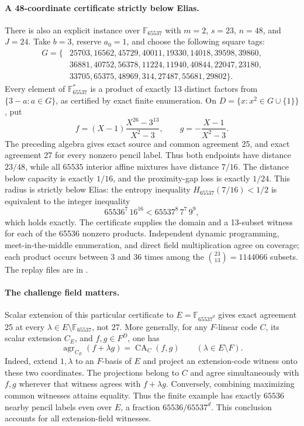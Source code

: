 \paragraph{A 48-coordinate certificate strictly below Elias.}
There is also an explicit instance over $\mathbb F_{65537}$ with
$m=2$, $s=23$, $n=48$, and $J=24$. Take $b=3$, reserve $a_0=1$,
and choose the following square tags:
\[
\begin{split}
G=\{&25703,16562,45729,40011,19330,14018,39598,39860,\allowbreak\\
    &36881,40752,56378,11224,11940,40844,22047,23180,\allowbreak\\
    &33705,65375,48969,314,27487,55681,29802\}.
\end{split}
\]
Every element of $\mathbb F_{65537}^*$ is a product of exactly
13 distinct factors from $\{3-a:a\in G\}$, as certified by exact
finite enumeration. On $D=\{x:x^2\in G\cup\{1\}\}$, put
\[
 f=(X-1)\frac{X^{26}-3^{13}}{X^2-3},\qquad
 g=-\frac{X-1}{X^2-3}.
\]
The preceding algebra gives exact source and common agreement 25,
and exact agreement 27 for every nonzero pencil label. Thus both
endpoints have distance $23/48$, while all $65535$ interior affine
mixtures have distance $7/16$. The distance below capacity is exactly
$1/16$, and the proximity-gap loss is exactly $1/24$.
This radius is strictly below Elias: the entropy inequality
$H_{65537}(7/16)<1/2$ is equivalent to the integer inequality
\[
 65536^7\,16^{16}<65537^8\,7^7\,9^9,
\]
which holds exactly. The certificate supplies the domain and a
13-subset witness for each of the 65536 nonzero products.
Independent dynamic programming, meet-in-the-middle enumeration,
and direct field multiplication agree on coverage; each product occurs
between 3 and 36 times among the $\binom{23}{13}=1144066$ subsets.
The replay files are in
.

\paragraph{The challenge field matters.}
Scalar extension of this particular certificate to
$E=\mathbb F_{65537^d}$ gives exact agreement 25 at every
$\lambda\in E\setminus\mathbb F_{65537}$, not 27.
More generally, for any $F$-linear code $C$, its scalar extension
$C_E$, and $f,g\in F^D$, one has
\[
 \operatorname{agr}_{C_E}(f+\lambda g)
 =\operatorname{CA}_{C}(f,g)\qquad(\lambda\in E\setminus F).
\]
Indeed, extend $1,\lambda$ to an $F$-basis of $E$ and project an
extension-code witness onto these two coordinates. The projections
belong to $C$ and agree simultaneously with $f,g$ wherever that
witness agrees with $f+\lambda g$. Conversely, combining maximizing
common witnesses attains equality. Thus the finite example has exactly
$65536$ nearby pencil labels even over $E$, a fraction $65536/65537^d$.
This conclusion accounts for all extension-field witnesses.

